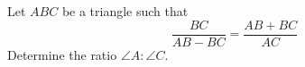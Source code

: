Let $ ABC$ be a triangle such that \[ \frac{BC}{AB - BC}=\frac{AB + BC}{AC}\] Determine the ratio $ \angle A : \angle C$.